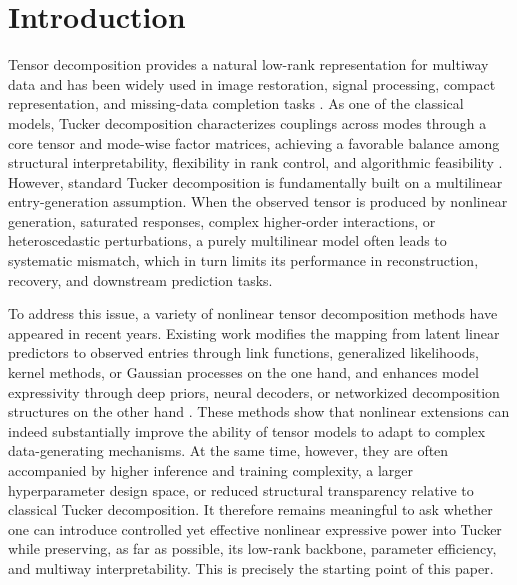 \section{Introduction}

Tensor decomposition provides a natural low-rank representation for multiway data and has been widely used in image restoration, signal processing, compact representation, and missing-data completion tasks \cite{Kolda2009Tensor,DeLathauwer2000MLSVD,Cichocki2015SignalProcessing,Sidiropoulos2017TSP,Liu2013TensorCompletion}. As one of the classical models, Tucker decomposition characterizes couplings across modes through a core tensor and mode-wise factor matrices, achieving a favorable balance among structural interpretability, flexibility in rank control, and algorithmic feasibility \cite{tucker1966some,de2000multilinear,Kolda2009Tensor}. However, standard Tucker decomposition is fundamentally built on a multilinear entry-generation assumption. When the observed tensor is produced by nonlinear generation, saturated responses, complex higher-order interactions, or heteroscedastic perturbations, a purely multilinear model often leads to systematic mismatch, which in turn limits its performance in reconstruction, recovery, and downstream prediction tasks.

To address this issue, a variety of nonlinear tensor decomposition methods have appeared in recent years. Existing work modifies the mapping from latent linear predictors to observed entries through link functions, generalized likelihoods, kernel methods, or Gaussian processes on the one hand, and enhances model expressivity through deep priors, neural decoders, or networkized decomposition structures on the other hand \cite{hong2020generalized,xu2011infinite,saragadam2024deeptensor,varolgunes2023nmtucker,zhai2024quadratic}. These methods show that nonlinear extensions can indeed substantially improve the ability of tensor models to adapt to complex data-generating mechanisms. At the same time, however, they are often accompanied by higher inference and training complexity, a larger hyperparameter design space, or reduced structural transparency relative to classical Tucker decomposition. It therefore remains meaningful to ask whether one can introduce controlled yet effective nonlinear expressive power into Tucker while preserving, as far as possible, its low-rank backbone, parameter efficiency, and multiway interpretability. This is precisely the starting point of this paper.

